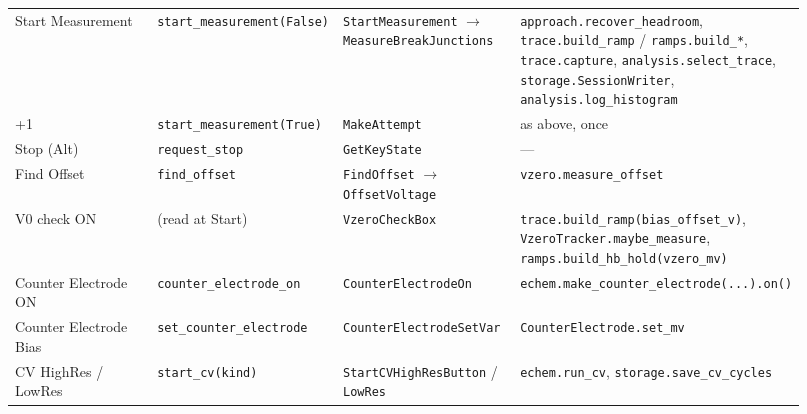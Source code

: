 \begin{longtable}{@{}>{\raggedright\arraybackslash}p{0.230\linewidth}>{\raggedright\arraybackslash}p{0.230\linewidth}>{\raggedright\arraybackslash}p{0.230\linewidth}>{\raggedright\arraybackslash}p{0.230\linewidth}@{}}
Start Measurement & \texttt{start\_\discretionary{}{}{}measurement(False)} & \texttt{Start\discretionary{}{}{}Measurement} $\rightarrow$ \texttt{Measure\discretionary{}{}{}Break\discretionary{}{}{}Junctions} & \texttt{approach.\discretionary{}{}{}recover\_\discretionary{}{}{}headroom}, \texttt{trace.\discretionary{}{}{}build\_\discretionary{}{}{}ramp} / \texttt{ramps.\discretionary{}{}{}build\_\discretionary{}{}{}*}, \texttt{trace.\discretionary{}{}{}capture}, \texttt{analysis.\discretionary{}{}{}select\_\discretionary{}{}{}trace}, \texttt{storage.\discretionary{}{}{}Session\discretionary{}{}{}Writer}, \texttt{analysis.\discretionary{}{}{}log\_\discretionary{}{}{}histogram} \\
+1 & \texttt{start\_\discretionary{}{}{}measurement(True)} & \texttt{Make\discretionary{}{}{}Attempt} & as above, once \\
Stop (Alt) & \texttt{request\_\discretionary{}{}{}stop} & \texttt{Get\discretionary{}{}{}Key\discretionary{}{}{}State} & --- \\
Find Offset & \texttt{find\_\discretionary{}{}{}offset} & \texttt{Find\discretionary{}{}{}Offset} $\rightarrow$ \texttt{Offset\discretionary{}{}{}Voltage} & \texttt{vzero.\discretionary{}{}{}measure\_\discretionary{}{}{}offset} \\
V0 check ON & (read at Start) & \texttt{Vzero\discretionary{}{}{}Check\discretionary{}{}{}Box} & \texttt{trace.\discretionary{}{}{}build\_\discretionary{}{}{}ramp(bias\_\discretionary{}{}{}offset\_\discretionary{}{}{}v)}, \texttt{Vzero\discretionary{}{}{}Tracker.\discretionary{}{}{}maybe\_\discretionary{}{}{}measure}, \texttt{ramps.\discretionary{}{}{}build\_\discretionary{}{}{}hb\_\discretionary{}{}{}hold(vzero\_\discretionary{}{}{}mv)} \\
Counter Electrode ON & \texttt{counter\_\discretionary{}{}{}electrode\_\discretionary{}{}{}on} & \texttt{Counter\discretionary{}{}{}Electrode\discretionary{}{}{}On} & \texttt{echem.\discretionary{}{}{}make\_\discretionary{}{}{}counter\_\discretionary{}{}{}electrode(.\discretionary{}{}{}.\discretionary{}{}{}.\discretionary{}{}{}).\discretionary{}{}{}on()} \\
Counter Electrode Bias & \texttt{set\_\discretionary{}{}{}counter\_\discretionary{}{}{}electrode} & \texttt{Counter\discretionary{}{}{}Electrode\discretionary{}{}{}Set\discretionary{}{}{}Var} & \texttt{Counter\discretionary{}{}{}Electrode.\discretionary{}{}{}set\_\discretionary{}{}{}mv} \\
CV HighRes / LowRes & \texttt{start\_\discretionary{}{}{}cv(kind)} & \texttt{Start\discretionary{}{}{}CVHigh\discretionary{}{}{}Res\discretionary{}{}{}Button} / \texttt{Low\discretionary{}{}{}Res} & \texttt{echem.\discretionary{}{}{}run\_\discretionary{}{}{}cv}, \texttt{storage.\discretionary{}{}{}save\_\discretionary{}{}{}cv\_\discretionary{}{}{}cycles} \\

\end{longtable}
